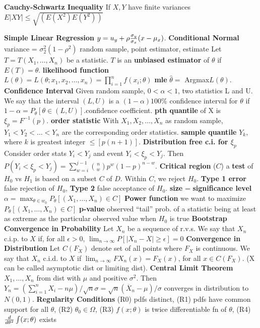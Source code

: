 {{\bf Cauchy-Schwartz Inequality} If $X,Y$ have finite variances $E|XY|\leq\sqrt{(E(X^2)E(Y^2))}$

{\bf Simple Linear Regression} $y = u_y+\rho{\sigma_y \over \sigma_x}(x-\mu_x)$.\quad
{\bf Conditional Normal} variance = $\sigma_2^2(1-\rho^2)$\quad
random sample, point estimator, estimate\quad
Let $T=T(X_1,\dots,X_n)$ be a statistic.  $T$ is an {\bf unbiased estimator} of $\theta$ if $E(T)=\theta$.
{\bf likelihood function} $L(\theta) = L(\theta;x_1,x_2,\dots,x_n)=\prod_{i=1}^nf(x_i;\theta)$\quad
{\bf mle} $\hat\theta = $ Argmax$L(\theta)$.\quad
{\bf Confidence Interval} Given random sample, $0 < \alpha < 1$, two statistics L and U.  We say that the interval $(L,U)$ is a $(1-\alpha)100\%$ confidence interval for $\theta$ if $1-\alpha = P_\theta[\theta \in (L,U)]$.\quad confidence coefficient.\quad
{\bf pth quantile} of X is $\xi_p = F^{-1}(p)$.\quad
{\bf order statistic} With $X_1,X_2,\dots,X_n$ as random sample, $Y_1<Y_2<\dots<Y_n$ are the corresponding order statistics.\quad
{\bf sample quantile} $Y_k$, where $k$ is greatest integer $\leq [p (n+1)]$.\quad
{\bf Distribution free c.i. for $\xi_p$} Consider order stats $Y_i<Y_j$ and event $Y_i<\xi_p<Y_j$.  Then $P(Y_i<\xi_p<Y_j)=\sum_{w=i}^{j-1}{n \choose w}p^w(1-p)^{n-w}$.
{\bf Critical region} ($C$) a {\bf test} of $H_0$ vs $H_1$ is based on a subset $C$ of $D$. Within $C$, we reject $H_0$.\quad
{\bf Type 1 error } false rejection of $H_0$, {\bf Type 2} false acceptance of $H_0$.
{\bf size} = {\bf significance level} $\alpha = \max_{\theta \in w_0}{P_\theta[(X_1,\dots,X_n) \in C]}$\quad
{\bf Power function} we want to maximize $P_\theta[(X_1,\dots,X_n) \in C]$\quad
{\bf p-value} observed ``tail'' prob. of a statistic being at least as extreme as the particular observed value when $H_0$ is true\quad
{\bf Bootstrap} \quad
{\bf Convergence in Probability} Let ${X_n}$ be a sequence of r.v.s.  We say that $X_n$ c.i.p. to $X$ if, for all $\epsilon > 0$, $\lim_{n\rightarrow \infty}P[|X_n-X| \geq \epsilon] = 0$\quad
{\bf Convergence in Distribution} Let $C(F_X)$ denote set of all points where $F_X$ is continuous.  We say that $X_n$ c.i.d. to $X$ if $\lim_{n \rightarrow \infty}F{X_n}(x) = F_X(x)$, for all $x \in C(F_X)$. (X can be called asymptotic dist or limiting dist). \quad
{}%
{\bf Central Limit Theorem} $X_1,\dots,X_n$ from dist with $\mu$ and positive $\sigma^2$.  Then $Y_n=(\sum_{i=1}^{n}X_i-n\mu)/\sqrt{n}\sigma = \sqrt{n}(\overline X_n - \mu)/\sigma$ converges in distribution to $N(0,1)$.\quad
{\bf Regularity Conditions} (R0) pdfs distinct, (R1) pdfs have common support for all $\theta$, (R2) $\theta_0 \in \Omega$, (R3) $f(x;\theta)$ is twice differentiable fn of $\theta$, (R4) ${d \over d\theta^2}\int(x;\theta)$ exists\quad
}

